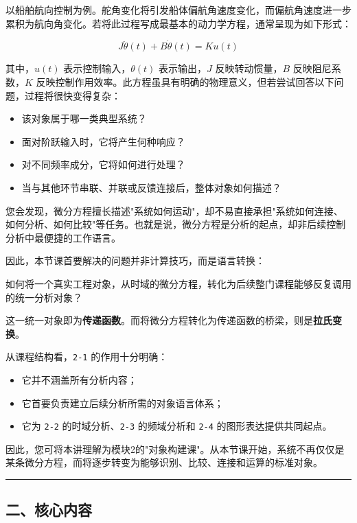 \documentclass[
  11pt]{article}
\providecommand{\tightlist}{%
  \setlength{\itemsep}{0pt}\setlength{\parskip}{0pt}}
\renewenvironment{quote}
  {\begin{HandoutQuoteBox}\small\color{TitleBlue}\noindent\ignorespaces}
  {\end{HandoutQuoteBox}}
\begin{document}
以船舶航向控制为例。舵角变化将引发船体偏航角速度变化，而偏航角速度进一步累积为航向角变化。若将此过程写成最基本的动力学方程，通常呈现为如下形式：

\[
J\ddot{\theta}(t)+B\dot{\theta}(t)=Ku(t)
\]

其中，\(u(t)\) 表示控制输入，\(\theta(t)\) 表示输出，\(J\)
反映转动惯量，\(B\) 反映阻尼系数，\(K\)
反映控制作用效率。此方程虽具有明确的物理意义，但若尝试回答以下问题，过程将很快变得复杂：

\begin{itemize}
\tightlist
\item
  该对象属于哪一类典型系统？
\item
  面对阶跃输入时，它将产生何种响应？
\item
  对不同频率成分，它将如何进行处理？
\item
  当与其他环节串联、并联或反馈连接后，整体对象如何描述？
\end{itemize}

您会发现，微分方程擅长描述"系统如何运动"，却不易直接承担"系统如何连接、如何分析、如何比较"等任务。也就是说，微分方程是分析的起点，却非后续控制分析中最便捷的工作语言。

因此，本节课首要解决的问题并非计算技巧，而是语言转换：

\begin{quote}
如何将一个真实工程对象，从时域的微分方程，转化为后续整门课程能够反复调用的统一分析对象？
\end{quote}

这一统一对象即为\textbf{传递函数}。而将微分方程转化为传递函数的桥梁，则是\textbf{拉氏变换}。

从课程结构看，\texttt{2-1} 的作用十分明确：

\begin{itemize}
\tightlist
\item
  它并不涵盖所有分析内容；
\item
  它首要负责建立后续分析所需的对象语言体系；
\item
  它为 \texttt{2-2} 的时域分析、\texttt{2-3} 的频域分析和 \texttt{2-4}
  的图形表达提供共同起点。
\end{itemize}

因此，您可将本讲理解为模块2的"对象构建课"。从本节课开始，系统不再仅仅是某条微分方程，而将逐步转变为能够识别、比较、连接和运算的标准对象。

\begin{center}\rule{0.5\linewidth}{0.5pt}\end{center}

\subsection{二、核心内容}\label{ux4e8cux6838ux5fc3ux5185ux5bb9}
\end{document}
